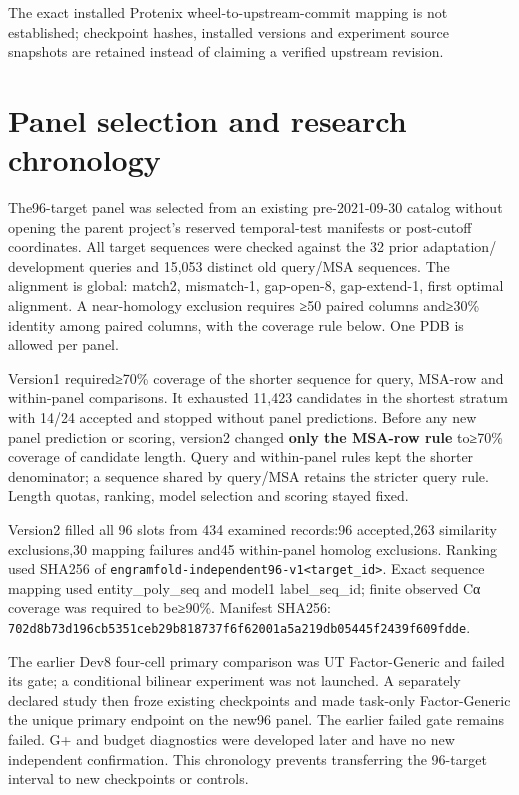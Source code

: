 The exact installed Protenix wheel-to-upstream-commit mapping is not established;
checkpoint hashes, installed versions and experiment source snapshots are retained
instead of claiming a verified upstream revision.

\section{Panel selection and research chronology}\label{panel-selection-and-research-chronology}

The96-target panel was selected from an existing pre-2021-09-30 catalog without
opening the parent project's reserved temporal-test manifests or post-cutoff
coordinates. All target sequences were checked against the 32 prior adaptation/
development queries and 15,053 distinct old query/MSA sequences. The alignment
is global: match2, mismatch-1, gap-open-8, gap-extend-1, first optimal alignment.
A near-homology exclusion requires ≥50 paired columns and≥30\% identity among
paired columns, with the coverage rule below. One PDB is allowed per panel.

Version1 required≥70\% coverage of the shorter sequence for query, MSA-row and
within-panel comparisons. It exhausted 11,423 candidates in the shortest stratum
with 14/24 accepted and stopped without panel predictions. Before any new panel
prediction or scoring, version2 changed \textbf{only the MSA-row rule} to≥70\% coverage
of candidate length. Query and within-panel rules kept the shorter denominator;
a sequence shared by query/MSA retains the stricter query rule. Length quotas,
ranking, model selection and scoring stayed fixed.

Version2 filled all 96 slots from 434 examined records:96 accepted,263 similarity
exclusions,30 mapping failures and45 within-panel homolog exclusions. Ranking
used SHA256 of \texttt{engramfold-independent96-v1\textbar{}\textless{}target\_id\textgreater{}}. Exact sequence mapping
used entity\_poly\_seq and model1 label\_seq\_id; finite observed Cα coverage was
required to be≥90\%. Manifest SHA256:
\nolinkurl{702d8b73d196cb5351ceb29b818737f6f62001a5a219db05445f2439f609fdde}.

The earlier Dev8 four-cell primary comparison was UT Factor-Generic and failed
its gate; a conditional bilinear experiment was not launched. A separately
declared study then froze existing checkpoints and made task-only Factor-Generic
the unique primary endpoint on the new96 panel. The earlier failed gate remains
failed. G+ and budget diagnostics were developed later and have no new independent
confirmation. This chronology prevents transferring the 96-target interval to
new checkpoints or controls.

